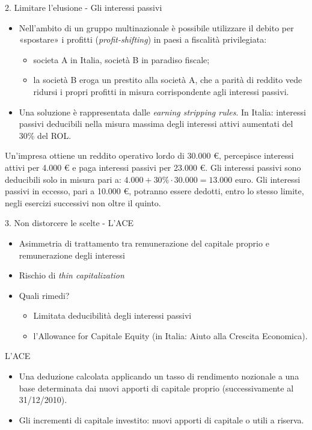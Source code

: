 \documentclass[aspectratio=149,11pt,italian]{beamer}
\begin{document}
\begin{frame}{2. Limitare l'elusione - Gli interessi passivi}
\begin{itemize}
\item Nell'ambito di un gruppo multinazionale è possibile utilizzare il debito per
«spostare» i profitti (\emph{profit-shifting}) in paesi a fiscalità privilegiata:
\begin{itemize}
\item societa A in Italia, società B in paradiso fiscale;
\item la società B eroga un prestito alla società A, che a parità di reddito
vede ridursi i propri profitti in misura corrispondente agli interessi
passivi.
\end{itemize}
\item Una soluzione è rappresentata dalle \emph{earning stripping rules}. In Italia:
interessi passivi deducibili nella misura massima degli interessi attivi
aumentati del 30\% del ROL.
\end{itemize}

\begin{example}[]
\small
Un'impresa ottiene un reddito operativo lordo di 30.000 €, percepisce
interessi attivi per 4.000 € e paga interessi passivi per 23.000 €.  Gli
interessi passivi sono deducibili solo in misura pari a: $4.000 + 30\% \cdot30.000
= 13.000$ euro. Gli interessi passivi in eccesso, pari a 10.000 €, potranno
essere dedotti, entro lo stesso limite, negli esercizi successivi non oltre il
quinto.
\end{example}
\end{frame}


\begin{frame}{3. Non distorcere le scelte - L'ACE}
\begin{itemize}
\item Asimmetria di trattamento tra remunerazione del capitale proprio e
remunerazione degli interessi
\item Rischio di \emph{thin capitalization}
\item Quali rimedi?
\begin{itemize}
\item Limitata deducibilità degli interessi passivi
\item l'Allowance for Capitale Equity (in Italia: Aiuto alla Crescita Economica).
\end{itemize}
\end{itemize}
\begin{block}{L'ACE}
\begin{itemize}
\item Una deduzione calcolata applicando un tasso di rendimento nozionale a una
base determinata dai nuovi apporti di capitale proprio (successivamente al
31/12/2010).
\item Gli incrementi di capitale investito: nuovi apporti di capitale o utili a
riserva.
\end{itemize}
\end{block}
\end{frame}
\end{document}
